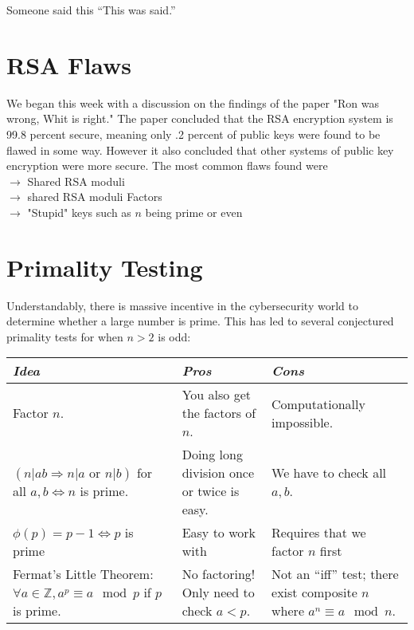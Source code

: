 
\begin{chapquote}{Someone said this}
``This was said.''
\end{chapquote}

\section{RSA Flaws}

We began this week with a discussion on the findings of the paper "Ron was wrong, Whit is right." 
The paper concluded that the RSA encryption system is 99.8 percent secure, meaning only .2 percent of public keys were found to be flawed in some way. However it also concluded that other systems of public key encryption were more secure.
The most common flaws found were \\ $\longrightarrow$ Shared RSA moduli \\ $\longrightarrow$ shared RSA moduli Factors \\ $\longrightarrow$ "Stupid" keys such as $n$ being prime or even




\section{Primality Testing}

Understandably, there is massive incentive in the cybersecurity world to determine whether a large number is prime. This has led to several conjectured primality tests for when $n>2$ is odd:

\begin{center}
    \begin{tabular}{p{4cm}|p{4cm}|p{4cm}}
     \emph{Idea} & \emph{Pros} &\emph{Cons} \\ \hline
     Factor $n$. & You also get the factors of $n$. & Computationally impossible. \\ \hline
     $(n|ab \Rightarrow n|a \textrm{ or } n|b)$ for all $a,b
     \Leftrightarrow n$ is prime.
     & Doing long division once or twice is easy.
     & We have to check all $a,b$. \\ \hline
     $\phi(p)=p-1 \Leftrightarrow p$ is prime & Easy to work with & Requires that we factor $n$ first \\ \hline
     Fermat's Little Theorem: $\forall a \in \mathbb Z, a^p \equiv a \mod p$ if $p$ is prime.
     & No factoring! Only need to check $a<p$. 
     & Not an ``iff'' test; there exist composite $n$ where $a^n \equiv a \mod n$. 
    \end{tabular}
\end{center}

